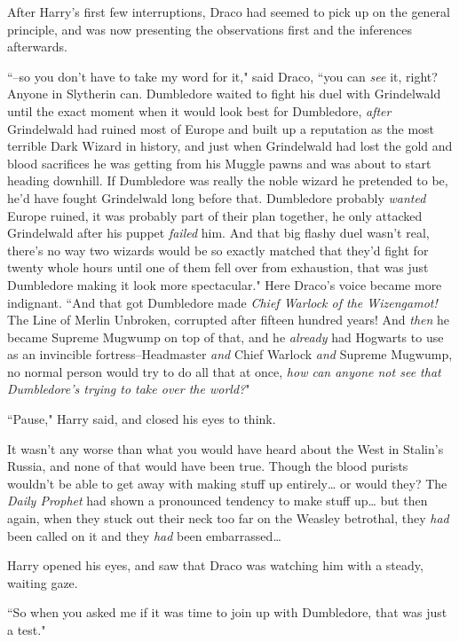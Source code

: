 After Harry's first few interruptions, Draco had seemed to pick up on the general principle, and was now presenting the observations first and the inferences afterwards.

``\---so you don't have to take my word for it," said Draco, ``you can \emph{see} it, right? Anyone in Slytherin can. Dumbledore waited to fight his duel with Grindelwald until the exact moment when it would look best for Dumbledore, \emph{after} Grindelwald had ruined most of Europe and built up a reputation as the most terrible Dark Wizard in history, and just when Grindelwald had lost the gold and blood sacrifices he was getting from his Muggle pawns and was about to start heading downhill. If Dumbledore was really the noble wizard he pretended to be, he'd have fought Grindelwald long before that. Dumbledore probably \emph{wanted} Europe ruined, it was probably part of their plan together, he only attacked Grindelwald after his puppet \emph{failed} him. And that big flashy duel wasn't real, there's no way two wizards would be so exactly matched that they'd fight for twenty whole hours until one of them fell over from exhaustion, that was just Dumbledore making it look more spectacular." Here Draco's voice became more indignant. ``And that got Dumbledore made \emph{Chief Warlock of the Wizengamot!} The Line of Merlin Unbroken, corrupted after fifteen hundred years! And \emph{then} he became Supreme Mugwump on top of that, and he \emph{already} had Hogwarts to use as an invincible fortress\---Headmaster \emph{and} Chief Warlock \emph{and} Supreme Mugwump, no normal person would try to do all that at once, \emph{how can anyone not see that Dumbledore's trying to take over the world?}"

``Pause," Harry said, and closed his eyes to think.

It wasn't any worse than what you would have heard about the West in Stalin's Russia, and none of that would have been true. Though the blood purists wouldn't be able to get away with making stuff up entirely{\ldots} or would they? The \emph{Daily Prophet} had shown a pronounced tendency to make stuff up{\ldots} but then again, when they stuck out their neck too far on the Weasley betrothal, they \emph{had} been called on it and they \emph{had} been embarrassed{\ldots}

Harry opened his eyes, and saw that Draco was watching him with a steady, waiting gaze.

``So when you asked me if it was time to join up with Dumbledore, that was just a test."

